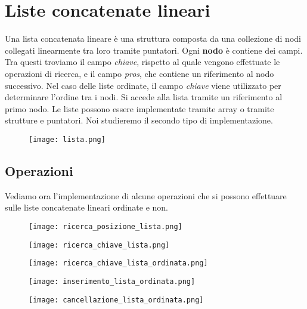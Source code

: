 \section{Liste concatenate lineari}
Una lista concatenata lineare è una struttura composta da una collezione
di nodi collegati linearmente tra loro tramite puntatori.
Ogni {\textbf{nodo}} è contiene dei campi. Tra questi troviamo il campo {\emph{chiave}}, rispetto
al quale vengono effettuate le operazioni di ricerca, e il campo {\emph{pros}}, che contiene
un riferimento al nodo successivo. Nel caso delle liste ordinate, il campo {\emph{chiave}} 
viene utilizzato per determinare l'ordine tra i nodi. Si accede alla lista tramite un riferimento al primo nodo.
Le liste possono essere implementate tramite array o tramite strutture e puntatori. Noi studieremo il secondo
tipo di implementazione.
\begin{figure}[h]
    \texttt{[image: lista.png]}
\end{figure}

\subsection{Operazioni}
Vediamo ora l'implementazione di alcune operazioni che si possono effettuare
sulle liste concatenate lineari ordinate e non.

\begin{figure}[h]
    \texttt{[image: ricerca\_posizione\_lista.png]}
\end{figure}

\begin{figure}[h]
    \texttt{[image: ricerca\_chiave\_lista.png]}
\end{figure}

\begin{figure}[h]
    \texttt{[image: ricerca\_chiave\_lista\_ordinata.png]}
\end{figure}

\begin{figure}[h]
    \texttt{[image: inserimento\_lista\_ordinata.png]}
\end{figure}

\begin{figure}[h]
    \texttt{[image: cancellazione\_lista\_ordinata.png]}
\end{figure}
\clearpage